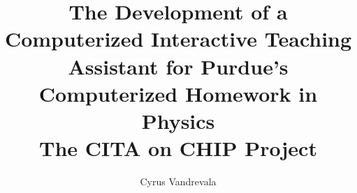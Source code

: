 \documentclass[11pt,twoside]{book}
\title{The Development of a Computerized Interactive Teaching Assistant for Purdue's Computerized Homework in Physics\\[0.2in]The CITA on CHIP Project}
\author{Cyrus Vandrevala}
\begin{document}
\frontmatter
\maketitle



\tableofcontents
\listoffigures
\listoftables

\mainmatter





\appendix




\backmatter


\printglossaries
\printindex
\end{document}
